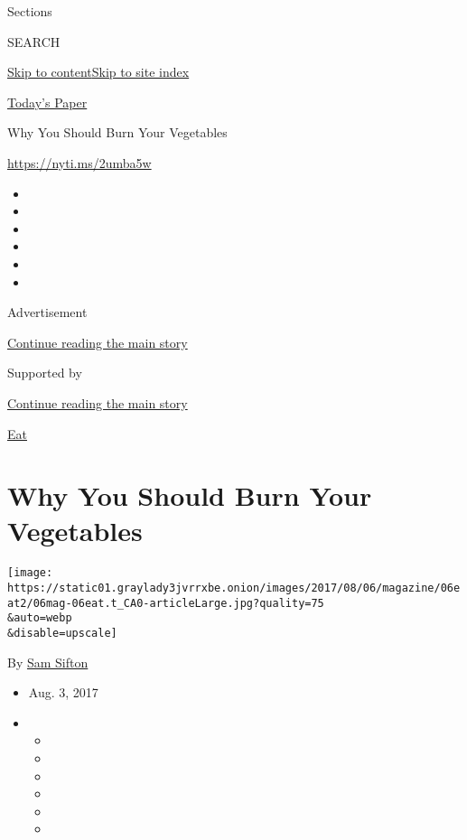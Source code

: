 Sections

SEARCH

\protect\hyperlink{site-content}{Skip to
content}\protect\hyperlink{site-index}{Skip to site index}

\href{https://myaccount.nytimes3xbfgragh.onion/auth/login?response_type=cookie\&client_id=vi}{}

\href{https://www.nytimes3xbfgragh.onion/section/todayspaper}{Today's
Paper}

Why You Should Burn Your Vegetables

\url{https://nyti.ms/2umba5w}

\begin{itemize}
\item
\item
\item
\item
\item
\item
\end{itemize}

Advertisement

\protect\hyperlink{after-top}{Continue reading the main story}

Supported by

\protect\hyperlink{after-sponsor}{Continue reading the main story}

\href{/column/magazine-eat}{Eat}

\hypertarget{why-you-should-burn-your-vegetables}{%
\section{Why You Should Burn Your
Vegetables}\label{why-you-should-burn-your-vegetables}}

\texttt{[image: https://static01.graylady3jvrrxbe.onion/images/2017/08/06/magazine/06eat2/06mag-06eat.t\_CA0-articleLarge.jpg?quality=75\\\&auto=webp\\\&disable=upscale]}

By \href{http://www.nytimes3xbfgragh.onion/by/sam-sifton}{Sam Sifton}

\begin{itemize}
\item
  Aug. 3, 2017
\item
  \begin{itemize}
  \item
  \item
  \item
  \item
  \item
  \item
  \end{itemize}
\end{itemize}


